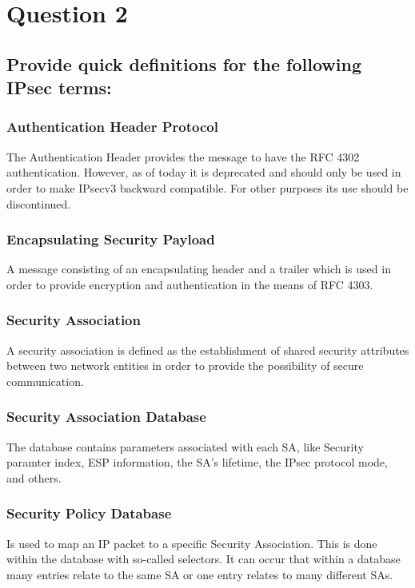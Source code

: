 \documentclass{report}
\begin{document}
	\section{Question 2}
	\startsection
		\renewcommand{\thesubsection}{\thesection.\Alph{subsection}}
		\subsection{Provide quick definitions for the following IPsec terms:}
		\startsubsection
			\subsubsection{Authentication Header Protocol}
			\startsubsection
				The Authentication Header provides the message to have the RFC 4302 authentication. However, as of today it is deprecated and should only be used in order to make IPsecv3 backward compatible. For other purposes its use should be discontinued.
			\closesection
			\subsubsection{Encapsulating Security Payload}
			\startsubsection
				A message consisting of an encapsulating header and a trailer which is used in order to provide encryption and authentication in the means of RFC 4303.
			\closesection
			\subsubsection{Security Association}
			\startsubsection
				A security association is defined as the establishment of shared security attributes between two network entities in order to provide the possibility of secure communication.
			\closesection
			\subsubsection{Security Association Database}
			\startsubsection
				The database contains parameters associated with each SA, like Security paramter index, ESP information, the SA's lifetime, the IPsec protocol mode, and others.
			\closesection
			\subsubsection{Security Policy Database}
			\startsubsection
				Is used to map an IP packet to a specific Security Association. This is done within the database with so-called selectors. It can occur that within a database many entries relate to the same SA or one entry relates to many different SAs.
			\closesection
		\closesection
	\closesection
\end{document}
